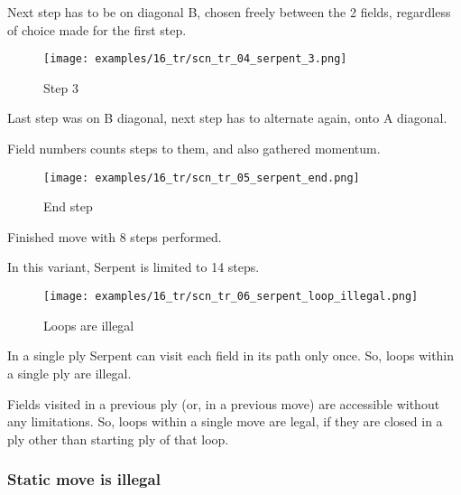 Next step has to be on diagonal B, chosen freely between the 2 fields,
regardless of choice made for the first step.

\clearpage %

\vspace*{-1.2\baselineskip}
\noindent
\begin{wrapfigure}[6]{l}{0.4\textwidth}
\centering
\texttt{[image: examples/16\_tr/scn\_tr\_04\_serpent\_3.png]}
\vspace*{-0.5\baselineskip}
\caption{Step 3}
\label{fig:scn_tr_04_serpent_3}
\end{wrapfigure}
Last step was on B diagonal, next step has to alternate again, onto A diagonal.

Field numbers counts steps to them, and also gathered momentum.

\vspace*{2.7\baselineskip}
\noindent
\begin{wrapfigure}[4]{l}{0.4\textwidth}
\centering
\texttt{[image: examples/16\_tr/scn\_tr\_05\_serpent\_end.png]}
\vspace*{-0.5\baselineskip}
\caption{End step}
\label{fig:scn_tr_05_serpent_end}
\end{wrapfigure}
Finished move with 8 steps performed.

In this variant, Serpent is limited to 14 steps.

\vspace*{4.7\baselineskip}
\noindent
\begin{wrapfigure}[9]{l}{0.4\textwidth}
\centering
\texttt{[image: examples/16\_tr/scn\_tr\_06\_serpent\_loop\_illegal.png]}
\vspace*{-0.5\baselineskip}
\caption{Loops are illegal}
\label{fig:scn_tr_06_serpent_loop_illegal}
\end{wrapfigure}
In a single ply Serpent can visit each field in its path only once.
So, loops within a single ply are illegal.

Fields visited in a previous ply (or, in a previous move) are accessible
without any limitations. So, loops within a single move are legal, if they
are closed in a ply other than starting ply of that loop.

\clearpage %

\subsubsection*{Static move is illegal}
\label{sec:Tamoanchan Revisited/Serpent/Movement/Static move is illegal}


